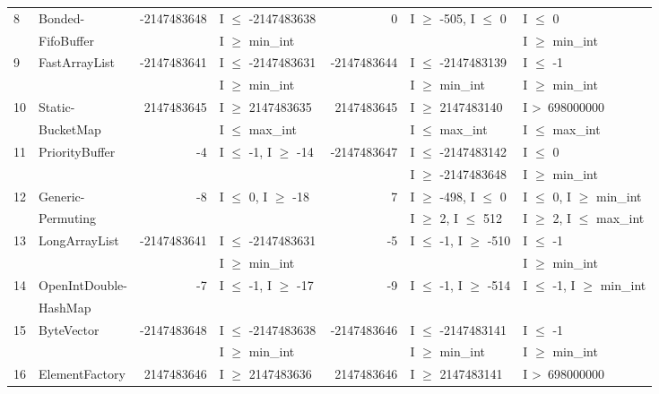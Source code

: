 {\begin{longtable}{|l|l|r|l|r|l|l|}
8	& Bonded-					&-2147483648	& I $\le$ -2147483638 		&~0				& I $\ge$ -505, I $\le$ 0			& I $\le$ 0 						\\
	& FifoBuffer					&				& I $\ge$ min\_int			&				& 								& I $\ge$ min\_int				\\	\hline
9	& FastArrayList				&-2147483641	& I $\le$ -2147483631 		&-2147483644	& I $\le$ -2147483139			& I $\le$ -1						\\ 
	&                                             &				& I $\ge$ min\_int			&				& I $\ge$ min\_int 				& I $\ge$ min\_int				\\\hline	
10	& Static-						&2147483645	& I $\ge$ 2147483635		&2147483645	& I $\ge$ 2147483140			& I \textgreater~698000000		\\ 
	& BucketMap                           &				& I $\le$ max\_int			&				& I $\le$ max\_int				& I $\le$ max\_int			   	\\\hline
11	& PriorityBuffer				&-4 			& I $\le$ -1, I $\ge$ -14		&-2147483647	& I $\le$  -2147483142			& I $\le$ 0						\\
	&                                             &				& 							&				& I $\ge$ -2147483648			& I $\ge$ min\_int			   	\\\hline
12	& Generic-					&-8 			& I $\le$ 0, I $\ge$ -18		&~7 			& I $\ge$ -498, I $\le$ 0			& I $\le$ 0, I $\ge$ min\_int		\\ 
	& Permuting                            &				& 							&				& I $\ge$ 2, I $\le$ 512			& I $\ge$ 2, I $\le$ max\_int		\\\hline
13	& LongArrayList				&-2147483641	& I $\le$ -2147483631		&-5 			& I $\le$ -1, I $\ge$ -510			& I $\le$ -1						\\ 
	&                                             &				& I $\ge$ min\_int			&				& 								& I $\ge$ min\_int				\\\hline
14	& OpenIntDouble- 			&-7 			& I $\le$ -1, I $\ge$ -17		&-9 			& I $\le$ -1, I $\ge$ -514			& I $\le$ -1, I $\ge$ min\_int		\\ 
	& HashMap					&				& 							&				& 								& 								\\ \hline
15	& ByteVector					&-2147483648	& I $\le$ -2147483638		&-2147483646	& I $\le$ -2147483141			& I $\le$ -1						\\ 
	&                                             &				& I $\ge$ min\_int			&				& I $\ge$ min\_int				& I $\ge$ min\_int				\\\hline
16	& ElementFactory				&2147483646	& I $\ge$ 2147483636		&~2147483646	& I $\ge$ 2147483141			& I \textgreater~698000000		\\ 

\end{longtable}}
